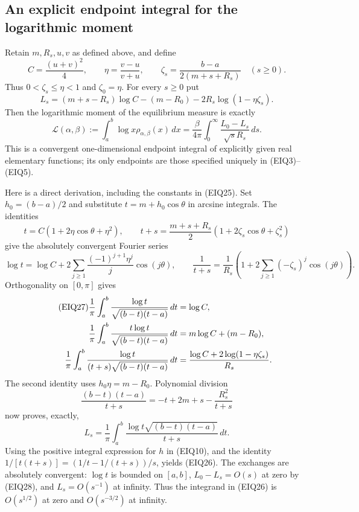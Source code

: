 \documentclass[11pt,a4paper]{article}
\begin{document}
\subsection{An explicit endpoint integral for the logarithmic moment}
Retain $m,R_s,u,v$ as defined above, and define
\begin{equation}\tag{EIQ24}
 C=\frac{(u+v)^2}4,\qquad
 \eta=\frac{v-u}{v+u},\qquad
 \zeta_s=\frac{b-a}{2(m+s+R_s)}\quad(s\geq0).
\end{equation}
Thus $0<\zeta_s\leq\eta<1$ and $\zeta_0=\eta$.
For every $s\geq0$ put
\begin{equation}\tag{EIQ25}
 L_s=(m+s-R_s)\log C-(m-R_0)
                  -2R_s\log(1-\eta\zeta_s).
\end{equation}
Then the logarithmic moment of the equilibrium measure is exactly
\begin{equation}\tag{EIQ26}
 \mathcal L(\alpha,\beta):=\int_a^b\log x\rho_{\alpha,\beta}(x)\,dx
 =\frac\beta{4\pi}\int_0^\infty
                    \frac{L_0-L_s}{\sqrt s R_s}\,ds.
\end{equation}
This is a convergent one-dimensional endpoint integral of explicitly
given real elementary functions; its only endpoints are those specified
uniquely in (EIQ3)--(EIQ5).

Here is a direct derivation, including the constants in (EIQ25).
Set $h_0=(b-a)/2$ and substitute $t=m+h_0\cos\theta$ in arcsine
integrals.  The identities
\[
 t=C(1+2\eta\cos\theta+\eta^2),\qquad
 t+s=\frac{m+s+R_s}2
                (1+2\zeta_s\cos\theta+\zeta_s^2)
\]
give the absolutely convergent Fourier series
\[
 \log t=\log C+
       2\sum_{j\geq1}\frac{(-1)^{j+1}\eta^j}j\cos(j\theta),
 \qquad
 \frac1{t+s}=\frac1{R_s}
       \left(1+2\sum_{j\geq1}(-\zeta_s)^j\cos(j\theta)\right).
\]
Orthogonality on $[0,\pi]$ gives
\begin{align}\tag{EIQ27}
 \frac1\pi\int_a^b\frac{\log t}{\sqrt{(b-t)(t-a)}}\,dt
 &=\log C,\\
 \frac1\pi\int_a^b\frac{t\log t}{\sqrt{(b-t)(t-a)}}\,dt
 &=m\log C+(m-R_0),\notag\\
 \frac1\pi\int_a^b\frac{\log t}{(t+s)\sqrt{(b-t)(t-a)}}\,dt
 &=\frac{\log C+2\log(1-\eta\zeta_s)}{R_s}.\notag
\end{align}
The second identity uses $h_0\eta=m-R_0$.
Polynomial division
\[
 \frac{(b-t)(t-a)}{t+s}
       =-t+2m+s-\frac{R_s^2}{t+s}
\]
now proves, exactly,
\begin{equation}\tag{EIQ28}
 L_s=\frac1\pi\int_a^b
               \frac{\log t\sqrt{(b-t)(t-a)}}{t+s}\,dt.
\end{equation}
Using the positive integral expression for $h$ in (EIQ10), and the
identity $1/[t(t+s)]=(1/t-1/(t+s))/s$, yields (EIQ26).
The exchanges are absolutely convergent: $\log t$ is bounded on
$[a,b]$, $L_0-L_s=O(s)$ at zero by (EIQ28), and $L_s=O(s^{-1})$
at infinity.  Thus the integrand in (EIQ26) is $O(s^{1/2})$ at zero
and $O(s^{-3/2})$ at infinity.
\end{document}
